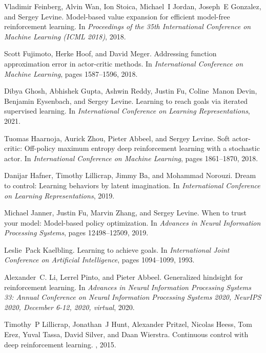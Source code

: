 \documentclass{article}
\begin{document}
\begin{thebibliography}{10}
Vladimir Feinberg, Alvin Wan, Ion Stoica, Michael~I Jordan, Joseph~E Gonzalez,
  and Sergey Levine.
\newblock Model-based value expansion for efficient model-free reinforcement
  learning.
\newblock In {\em Proceedings of the 35th International Conference on Machine
  Learning (ICML 2018)}, 2018.

Scott Fujimoto, Herke Hoof, and David Meger.
\newblock Addressing function approximation error in actor-critic methods.
\newblock In {\em International Conference on Machine Learning}, pages
  1587--1596, 2018.

Dibya Ghosh, Abhishek Gupta, Ashwin Reddy, Justin Fu, Coline~Manon Devin,
  Benjamin Eysenbach, and Sergey Levine.
\newblock Learning to reach goals via iterated supervised learning.
\newblock In {\em International Conference on Learning Representations}, 2021.

Tuomas Haarnoja, Aurick Zhou, Pieter Abbeel, and Sergey Levine.
\newblock Soft actor-critic: Off-policy maximum entropy deep reinforcement
  learning with a stochastic actor.
\newblock In {\em International Conference on Machine Learning}, pages
  1861--1870, 2018.

Danijar Hafner, Timothy Lillicrap, Jimmy Ba, and Mohammad Norouzi.
\newblock Dream to control: Learning behaviors by latent imagination.
\newblock In {\em International Conference on Learning Representations}, 2019.

Michael Janner, Justin Fu, Marvin Zhang, and Sergey Levine.
\newblock When to trust your model: Model-based policy optimization.
\newblock In {\em Advances in Neural Information Processing Systems}, pages
  12498--12509, 2019.

Leslie~Pack Kaelbling.
\newblock Learning to achieve goals.
\newblock In {\em International Joint Conference on Artificial Intelligence},
  pages 1094--1099, 1993.

Alexander~C. Li, Lerrel Pinto, and Pieter Abbeel.
\newblock Generalized hindsight for reinforcement learning.
\newblock In {\em Advances in Neural Information Processing Systems 33: Annual
  Conference on Neural Information Processing Systems 2020, NeurIPS 2020,
  December 6-12, 2020, virtual}, 2020.

Timothy~P Lillicrap, Jonathan~J Hunt, Alexander Pritzel, Nicolas Heess, Tom
  Erez, Yuval Tassa, David Silver, and Daan Wierstra.
\newblock Continuous control with deep reinforcement learning.
, 2015.


\end{thebibliography}
\end{document}
